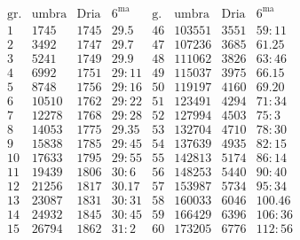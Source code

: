 \documentclass[11pt,a4paper]{article}
\begin{document}
\[
\begin{array}{r|r|r|r||r|r|r|r}
\text{gr.} & \text{umbra} & \text{Dria} & 6^{\text{ma}} & \text{g.} & \text{umbra} & \text{Dria} & 6^{\text{ma}} \\
\hline
1 & 1745 & 1745 & 29.5 & 46 & 103551 & 3551 & 59{:}11 \\
2 & 3492 & 1747 & 29.7 & 47 & 107236 & 3685 & 61.25 \\
3 & 5241 & 1749 & 29.9 & 48 & 111062 & 3826 & 63{:}46 \\
4 & 6992 & 1751 & 29{:}11 & 49 & 115037 & 3975 & 66.15 \\
5 & 8748 & 1756 & 29{:}16 & 50 & 119197 & 4160 & 69.20 \\
\hline
6 & 10510 & 1762 & 29{:}22 & 51 & 123491 & 4294 & 71{:}34 \\
7 & 12278 & 1768 & 29{:}28 & 52 & 127994 & 4503 & 75{:}3 \\
8 & 14053 & 1775 & 29.35 & 53 & 132704 & 4710 & 78{:}30 \\
9 & 15838 & 1785 & 29{:}45 & 54 & 137639 & 4935 & 82{:}15 \\
10 & 17633 & 1795 & 29{:}55 & 55 & 142813 & 5174 & 86{:}14 \\
\hline
11 & 19439 & 1806 & 30{:}6 & 56 & 148253 & 5440 & 90{:}40 \\
12 & 21256 & 1817 & 30.17 & 57 & 153987 & 5734 & 95{:}34 \\
13 & 23087 & 1831 & 30{:}31 & 58 & 160033 & 6046 & 100.46 \\
14 & 24932 & 1845 & 30{:}45 & 59 & 166429 & 6396 & 106{:}36 \\
15 & 26794 & 1862 & 31{:}2 & 60 & 173205 & 6776 & 112{:}56 \\
\end{array}
\]
\end{document}
